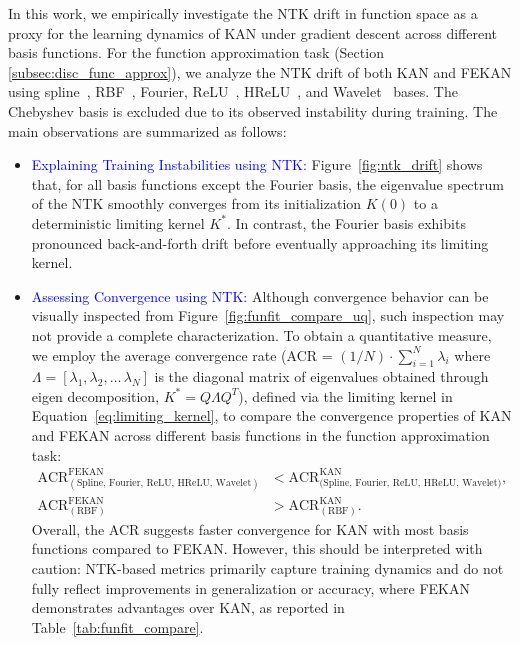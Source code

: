 \documentclass{article}
\begin{document}
In this work, we empirically investigate the NTK drift in function space as a proxy for the learning dynamics of KAN under gradient descent across different basis functions. For the function approximation task (Section \ref{subsec:disc_func_approx}), we analyze the NTK drift of both KAN and FEKAN using spline~\cite{liu2024kan}, RBF~\cite{li2024kolmogorov}, Fourier, ReLU~\cite{qiu2024relu}, HReLU~\cite{so2025higher}, and Wavelet~\cite{bozorgasl2405wav} bases. The Chebyshev basis is excluded due to its observed instability during training. The main observations are summarized as follows:

\begin{itemize}
    \item \textcolor{blue}{Explaining Training Instabilities using NTK:} 
     Figure~\ref{fig:ntk_drift} shows that, for all basis functions except the Fourier basis, the eigenvalue spectrum of the NTK smoothly converges from its initialization $K(0)$ to a deterministic limiting kernel $K^*$. In contrast, the Fourier basis exhibits pronounced back-and-forth drift before eventually approaching its limiting kernel. %
    \item \textcolor{blue}{Assessing Convergence using NTK:} 
     Although convergence behavior can be visually inspected from Figure~\ref{fig:funfit_compare_uq}, such inspection may not provide a complete characterization. To obtain a quantitative measure, we employ the average convergence rate (ACR = $(1/N)\cdot\sum_{i=1}^{N}\lambda_i$ where $\Lambda = [\lambda_1, \lambda_2, \dots\, \lambda_N]$ is the diagonal matrix of eigenvalues obtained through eigen decomposition, $K^* = Q\Lambda Q^T$), defined via the limiting kernel in Equation~\ref{eq:limiting_kernel}, to compare the convergence properties of KAN and FEKAN across different basis functions in the function approximation task:
     \begin{align*}
     \text{ACR}_{(\text{Spline, Fourier, ReLU, HReLU, Wavelet})}^{\text{FEKAN}} 
     &< 
     \text{ACR}_{(\text{Spline, Fourier, ReLU, HReLU, Wavelet)}}^{\text{KAN}}, \\
     \text{ACR}_{(\text{RBF})}^{\text{FEKAN}} 
     &> 
     \text{ACR}_{(\text{RBF})}^{\text{KAN}}.
    \end{align*}
    Overall, the ACR suggests faster convergence for KAN with most basis functions compared to FEKAN. However, this should be interpreted with caution: NTK-based metrics primarily capture training dynamics and do not fully reflect improvements in generalization or accuracy, where FEKAN demonstrates advantages over KAN, as reported in Table~\ref{tab:funfit_compare}.

\end{itemize}
\end{document}
